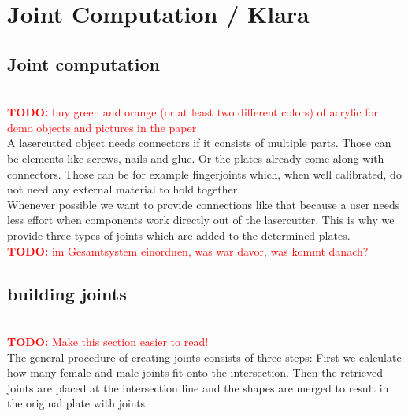 \documentclass[../ClassicThesis.tex]{subfiles}
\begin{document}
\chapter{Joint Computation / Klara}\label{ch:joints}
\newcommand{\TODO}[1]{\textcolor{red}{\\ \textbf{TODO:} #1 \\}}


\section{Joint computation}
\TODO{buy green and orange (or at least two different colors) of acrylic for demo objects and pictures in the paper}
A lasercutted object needs connectors if it consists of multiple parts. Those can be elements like screws, nails and glue. Or the plates already come along with connectors. Those can be for example fingerjoints which, when well calibrated, do not need any external material to hold together. \\
Whenever possible we want to provide connections like that because a user needs less effort when components work directly out of the lasercutter. This is why we provide three types of joints which are added to the determined plates.
\TODO{im Gesamtsystem einordnen, was war davor, was kommt danach?}

\section{building joints}
\TODO{Make this section easier to read!}
The general procedure of creating joints consists of three steps: First we calculate how many female and male joints fit onto the intersection. Then the retrieved joints are placed at the intersection line and the shapes are merged to result in the original plate with joints.
\end{document}
